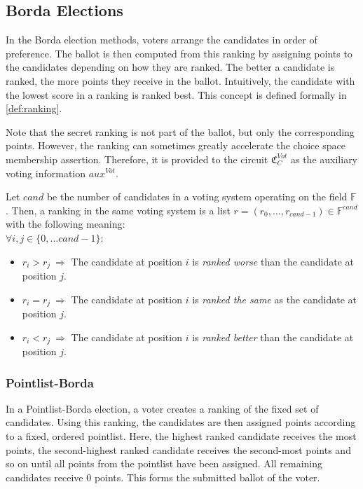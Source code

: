 \subsection{Borda Elections}
In the Borda election methods, voters arrange the candidates in order of preference.
The ballot is then computed from this ranking by assigning points to the candidates depending on how they are ranked.
The better a candidate is ranked, the more points they receive in the ballot. 
Intuitively, the candidate with the lowest score in a ranking is ranked best.
This concept is defined formally in \cref{def:ranking}.

Note that the secret ranking is not part of the ballot, but only the corresponding points.
However, the ranking can sometimes greatly accelerate the choice space membership assertion.
Therefore, it is provided to the circuit $\mathfrak{C}_C^{Vot}$ as the auxiliary voting information $aux^{Vot}$.

\begin{definition}[Ranking]
    \label{def:ranking}
    Let $cand$ be the number of candidates in a voting system operating on the field $\mathbb{F}$.
    Then, a ranking in the same voting system is a list $r=(r_0,\dots, r_{cand-1})\in\mathbb{F}^{cand}$ with the following meaning:\\
    $\forall i, j\in\{0,\dots cand-1\}$:
    \begin{itemize}
        \item $r_i > r_j\:\Rightarrow$ The candidate at position $i$ is \textit{ranked worse} than the candidate at position $j$.
        \item $r_i = r_j\:\Rightarrow$ The candidate at position $i$ is \textit{ranked the same} as the candidate at position $j$.
        \item $r_i < r_j\:\Rightarrow$ The candidate at position $i$ is \textit{ranked better} than the candidate at position $j$.
    \end{itemize}
\end{definition}

\subsubsection{Pointlist-Borda}
In a Pointlist-Borda election, a voter creates a ranking of the fixed set of candidates.
Using this ranking, the candidates are then assigned points according to a fixed, ordered pointlist.
Here, the highest ranked candidate receives the most points, the second-highest ranked candidate receives the second-most points and so on until all points from the pointlist have been assigned.
All remaining candidates receive $0$ points.
This forms the submitted ballot of the voter.

